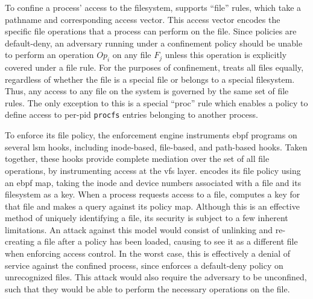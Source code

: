 \subsubsection{\bpfbox{}}

To confine a process' access to the filesystem, \bpfbox{} supports \enquote{file} rules,
which take a pathname and corresponding access vector. This access vector encodes the
specific file operations that a process can perform on the file. Since \bpfbox{} policies
are default-deny, an adversary running under a \bpfbox{} confinement policy should be
unable to perform an operation $Op_i$ on any file $F_j$ unless this operation is
explicitly covered under a file rule. For the purposes of confinement, \bpfbox{} treats
all files equally, regardless of whether the file is a special file or belongs to
a special filesystem. Thus, any access to any file on the system is governed by the same
set of file rules. The only exception to this is a special \enquote{proc} rule which
enables a policy to define access to per-pid \texttt{procfs} entries belonging to another
process.

To enforce its file policy, the \bpfbox{} enforcement engine instruments \gls{ebpf}
programs on several \gls{lsm} hooks, including inode-based, file-based, and path-based
hooks. Taken together, these hooks provide complete mediation over the set of all file
operations, by instrumenting access at the \gls{vfs} layer. \bpfbox{} encodes its file
policy using an \gls{ebpf} map, taking the inode and device numbers associated with a file
and its filesystem as a key. When a process requests access to a file, \bpfbox{} computes
a key for that file and makes a query against its policy map. Although this is an
effective method of uniquely identifying a file, its security is subject to a few inherent
limitations. An attack against this model would consist of unlinking and re-creating a file after
a policy has been loaded, causing \bpfbox{} to see it as a different file when enforcing
access control. In the worst case, this is effectively a denial of service against the
confined process, since \bpfbox{} enforces a default-deny policy on unrecognized files.
This attack would also require the adversary to be unconfined, such that they would be
able to perform the necessary operations on the file.

\subsubsection{\bpfcontain{}}

